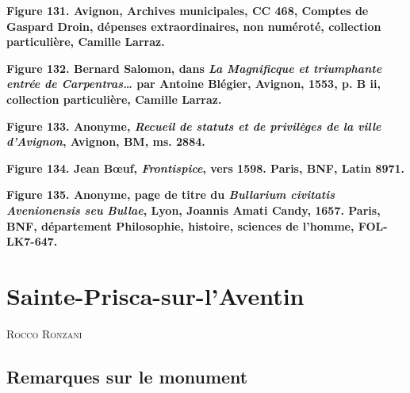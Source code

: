 \documentclass[12pt,twoside,openany]{book}
\newcommand{\PurhContributors}[1]{%
  \par\vspace{0.5\baselineskip}%
  {\normalsize\scshape #1\par}%
  \vspace{0.6\baselineskip}%
}
\begin{document}
\begin{center}
\par\small \textbf{Figure 131. Avignon, Archives municipales, CC 468, Comptes de Gaspard Droin, dépenses extraordinaires, non numéroté, collection particulière, Camille Larraz.}
\end{center}

\begin{center}
\par\small \textbf{Figure 132. Bernard Salomon, dans \textit{La Magnificque et triumphante entrée de Carpentras… }par Antoine Blégier, Avignon, 1553, p. B ii, collection particulière, Camille Larraz.}
\end{center}

\begin{center}
\par\small \textbf{Figure 133. Anonyme, \textit{Recueil de statuts et de privilèges de la ville d’Avignon}, Avignon, BM, ms. 2884.}
\end{center}

\begin{center}
\par\small \textbf{Figure 134. Jean Bœuf, \textit{Frontispice}, vers 1598. Paris, BNF, Latin 8971.}
\end{center}

\begin{center}
\par\small \textbf{Figure 135. Anonyme, page de titre du \textit{Bullarium civitatis Avenionensis seu Bullae}, Lyon, Joannis Amati Candy, 1657. Paris, BNF, département Philosophie, histoire, sciences de l’homme, FOL-LK7-647.}
\end{center}

\chapter{Sainte-Prisca-sur-l’Aventin}

\PurhContributors{Rocco Ronzani}

\section{Remarques sur le monument}
\end{document}
